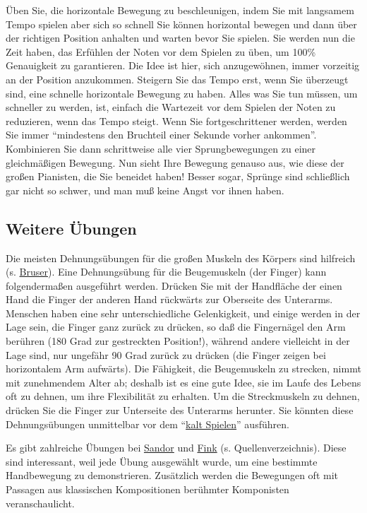 Üben Sie, die horizontale Bewegung zu beschleunigen, indem Sie mit langsamem Tempo spielen aber sich so schnell Sie können horizontal bewegen und dann über der richtigen Position anhalten und warten bevor Sie spielen.
Sie werden nun die Zeit haben, das Erfühlen der Noten vor dem Spielen zu üben, um 100\% Genauigkeit zu garantieren.
Die Idee ist hier, sich anzugewöhnen, immer vorzeitig an der Position anzukommen.
Steigern Sie das Tempo erst, wenn Sie überzeugt sind, eine schnelle horizontale Bewegung zu haben.
Alles was Sie tun müssen, um schneller zu werden, ist, einfach die Wartezeit vor dem Spielen der Noten zu reduzieren, wenn das Tempo steigt.
Wenn Sie fortgeschrittener werden, werden Sie immer \enquote{mindestens den Bruchteil einer Sekunde vorher ankommen}.
Kombinieren Sie dann schrittweise alle vier Sprungbewegungen zu einer gleichmäßigen Bewegung.
Nun sieht Ihre Bewegung genauso aus, wie diese der großen Pianisten, die Sie beneidet haben!
Besser sogar, Sprünge sind schließlich gar nicht so schwer, und man muß keine Angst vor ihnen haben.
 

\subsection{Weitere Übungen}\hypertarget{c1iii7g}{}

Die meisten Dehnungsübungen für die großen Muskeln des Körpers sind hilfreich (s. \hyperlink{Bruser}{Bruser}).
Eine Dehnungsübung für die Beugemuskeln (der Finger) kann folgendermaßen ausgeführt werden.
Drücken Sie mit der Handfläche der einen Hand die Finger der anderen Hand rückwärts zur Oberseite des Unterarms.
Menschen haben eine sehr unterschiedliche Gelenkigkeit, und einige werden in der Lage sein, die Finger ganz zurück zu drücken, so daß die Fingernägel den Arm berühren (180 Grad zur gestreckten Position!), während andere vielleicht in der Lage sind, nur ungefähr 90 Grad zurück zu drücken (die Finger zeigen bei horizontalem Arm aufwärts).
Die Fähigkeit, die Beugemuskeln zu strecken, nimmt mit zunehmendem Alter ab; deshalb ist es eine gute Idee, sie im Laufe des Lebens oft zu dehnen, um ihre Flexibilität zu erhalten.
Um die Streckmuskeln zu dehnen, drücken Sie die Finger zur Unterseite des Unterarms herunter.
Sie könnten diese Dehnungsübungen unmittelbar vor dem \enquote{\hyperlink{c1iii6g}{kalt Spielen}} ausführen.

 Es gibt zahlreiche Übungen bei \hyperlink{Sandor}{Sandor} und \hyperlink{Fink}{Fink} (s. Quellenverzeichnis).
Diese sind interessant, weil jede Übung ausgewählt wurde, um eine bestimmte Handbewegung zu demonstrieren.
Zusätzlich werden die Bewegungen oft mit Passagen aus klassischen Kompositionen berühmter Komponisten veranschaulicht.



